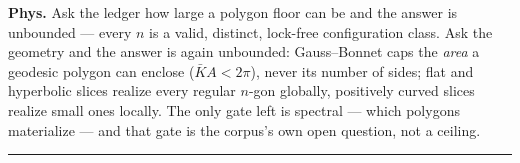\begin{theorem}
\textbf{Phys.} Ask the ledger how large a polygon floor can be and the answer is unbounded — every $n$ is a valid, distinct, lock-free configuration class. Ask the geometry and the answer is again unbounded: Gauss–Bonnet caps the \textit{area} a geodesic polygon can enclose ($\bar KA<2\pi$), never its number of sides; flat and hyperbolic slices realize every regular $n$-gon globally, positively curved slices realize small ones locally. The only gate left is spectral — which polygons materialize — and that gate is the corpus's own open question, not a ceiling.

\vspace{2pt}\noindent\rule{\textwidth}{0.4pt}\vspace{2pt}

\end{theorem}

